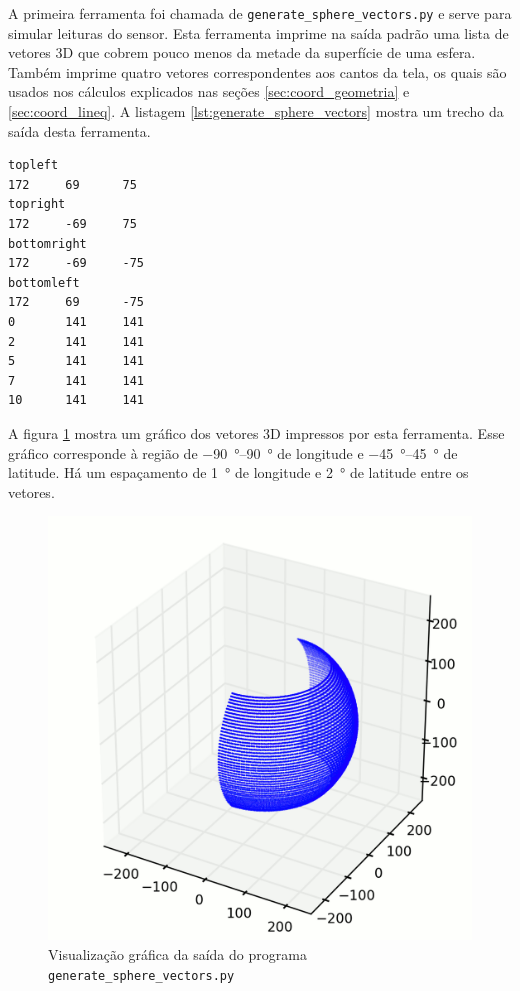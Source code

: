 \documentclass[brazil,pagestart=firstchapter]{abnt}
\begin{document}
A primeira ferramenta foi chamada de \texttt{generate\_sphere\_vectors.py} e
serve para simular leituras do sensor. Esta ferramenta imprime na saída
padrão uma lista de vetores 3D que cobrem pouco menos da metade da
superfície de uma esfera. Também imprime quatro vetores correspondentes aos
cantos da tela, os quais são usados nos cálculos explicados nas seções
\ref{sec:coord_geometria} e \ref{sec:coord_lineq}. A listagem
\ref{lst:generate_sphere_vectors} mostra um trecho da saída desta
ferramenta.

\begin{lstlisting}[numbers=none, float=h, label={lst:generate_sphere_vectors},
caption={Primeiras linhas da saída do programa \texttt{generate\_sphere\_vectors.py}}
]
topleft
172     69      75
topright
172     -69     75
bottomright
172     -69     -75
bottomleft
172     69      -75
0       141     141
2       141     141
5       141     141
7       141     141
10      141     141
\end{lstlisting}

A figura \ref{fig:half_sphere} mostra um gráfico dos vetores 3D
impressos por esta ferramenta. Esse gráfico corresponde à região de
\SIrange{-90}{90}{\degree} de longitude e \SIrange{-45}{45}{\degree} de
latitude. Há um espaçamento de \SI{1}{\degree} de longitude e
\SI{2}{\degree} de latitude entre os vetores.

\begin{figure}[h]
\centering
\includegraphics{img/half_sphere.png}
\caption{Visualização gráfica da saída do programa \texttt{generate\_sphere\_vectors.py}}
\label{fig:half_sphere}
\end{figure}
\end{document}
